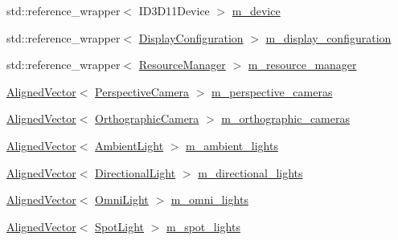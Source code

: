 \begin{DoxyCompactItemize}
\item 
std\+::reference\+\_\+wrapper$<$ I\+D3\+D11\+Device $>$ \hyperlink{classmage_1_1rendering_1_1_world_a58ea474801fba5e39ff4f8a7d4c0a842}{m\+\_\+device}
\item 
std\+::reference\+\_\+wrapper$<$ \hyperlink{classmage_1_1rendering_1_1_display_configuration}{Display\+Configuration} $>$ \hyperlink{classmage_1_1rendering_1_1_world_a1a3a7ddfc44d74195e60a9177d4f2f80}{m\+\_\+display\+\_\+configuration}
\item 
std\+::reference\+\_\+wrapper$<$ \hyperlink{classmage_1_1rendering_1_1_resource_manager}{Resource\+Manager} $>$ \hyperlink{classmage_1_1rendering_1_1_world_a89edf9b86ab3a8644c15e7f521e8642a}{m\+\_\+resource\+\_\+manager}
\item 
\hyperlink{namespacemage_a8664bfb5ce2179fc64eae9f82c8a5ba8}{Aligned\+Vector}$<$ \hyperlink{classmage_1_1rendering_1_1_perspective_camera}{Perspective\+Camera} $>$ \hyperlink{classmage_1_1rendering_1_1_world_a20712094ac433ad1651b0c7730bba96b}{m\+\_\+perspective\+\_\+cameras}
\item 
\hyperlink{namespacemage_a8664bfb5ce2179fc64eae9f82c8a5ba8}{Aligned\+Vector}$<$ \hyperlink{classmage_1_1rendering_1_1_orthographic_camera}{Orthographic\+Camera} $>$ \hyperlink{classmage_1_1rendering_1_1_world_a6cbb80ebd76a1f7121b455251fcab6db}{m\+\_\+orthographic\+\_\+cameras}
\item 
\hyperlink{namespacemage_a8664bfb5ce2179fc64eae9f82c8a5ba8}{Aligned\+Vector}$<$ \hyperlink{classmage_1_1rendering_1_1_ambient_light}{Ambient\+Light} $>$ \hyperlink{classmage_1_1rendering_1_1_world_a0c63647dbf30b3df91e6cfbb483847c9}{m\+\_\+ambient\+\_\+lights}
\item 
\hyperlink{namespacemage_a8664bfb5ce2179fc64eae9f82c8a5ba8}{Aligned\+Vector}$<$ \hyperlink{classmage_1_1rendering_1_1_directional_light}{Directional\+Light} $>$ \hyperlink{classmage_1_1rendering_1_1_world_a215d8925979f0cae6471315795f09cec}{m\+\_\+directional\+\_\+lights}
\item 
\hyperlink{namespacemage_a8664bfb5ce2179fc64eae9f82c8a5ba8}{Aligned\+Vector}$<$ \hyperlink{classmage_1_1rendering_1_1_omni_light}{Omni\+Light} $>$ \hyperlink{classmage_1_1rendering_1_1_world_ad7314066fa640f62ff56f90b0762a66d}{m\+\_\+omni\+\_\+lights}
\item 
\hyperlink{namespacemage_a8664bfb5ce2179fc64eae9f82c8a5ba8}{Aligned\+Vector}$<$ \hyperlink{classmage_1_1rendering_1_1_spot_light}{Spot\+Light} $>$ \hyperlink{classmage_1_1rendering_1_1_world_a6ea472361d7d1a6a829a9270913059c2}{m\+\_\+spot\+\_\+lights}

\end{DoxyCompactItemize}
